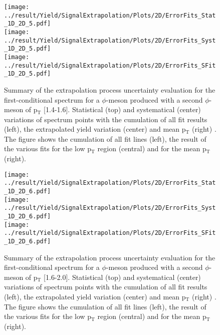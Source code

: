 \begin{figure}
\centering
\texttt{[image: ../result/Yield/SignalExtrapolation/Plots/2D/ErrorFits\_Stat\_1D\_2D\_5.pdf]}\\
\texttt{[image: ../result/Yield/SignalExtrapolation/Plots/2D/ErrorFits\_Syst\_1D\_2D\_5.pdf]}\\
\texttt{[image: ../result/Yield/SignalExtrapolation/Plots/2D/ErrorFits\_SFit\_1D\_2D\_5.pdf]}
\label{fig:Extrap2D_5}
\caption{Summary of the extrapolation process uncertainty evaluation for the first-conditional spectrum for a $\phi$-meson produced with a second $\phi$-meson of p$_{\text{T}}$ [1.4-1.6]. Statistical (top) and systematical (center) variations of spectrum points with the cumulation of all fit results (left), the extrapolated yield variation (center) and mean p$_{\text{T}}$ (right) . The figure shows the cumulation of all fit lines (left), the result of the various fits for the low p$_{\text{T}}$ region (central) and for the mean p$_{\text{T}}$ (right).}
\end{figure}

\begin{figure}
\centering
\texttt{[image: ../result/Yield/SignalExtrapolation/Plots/2D/ErrorFits\_Stat\_1D\_2D\_6.pdf]}\\
\texttt{[image: ../result/Yield/SignalExtrapolation/Plots/2D/ErrorFits\_Syst\_1D\_2D\_6.pdf]}\\
\texttt{[image: ../result/Yield/SignalExtrapolation/Plots/2D/ErrorFits\_SFit\_1D\_2D\_6.pdf]}
\label{fig:Extrap2D_6}
\caption{Summary of the extrapolation process uncertainty evaluation for the first-conditional spectrum for a $\phi$-meson produced with a second $\phi$-meson of p$_{\text{T}}$ [1.6-2.0]. Statistical (top) and systematical (center) variations of spectrum points with the cumulation of all fit results (left), the extrapolated yield variation (center) and mean p$_{\text{T}}$ (right) . The figure shows the cumulation of all fit lines (left), the result of the various fits for the low p$_{\text{T}}$ region (central) and for the mean p$_{\text{T}}$ (right).}
\end{figure}

